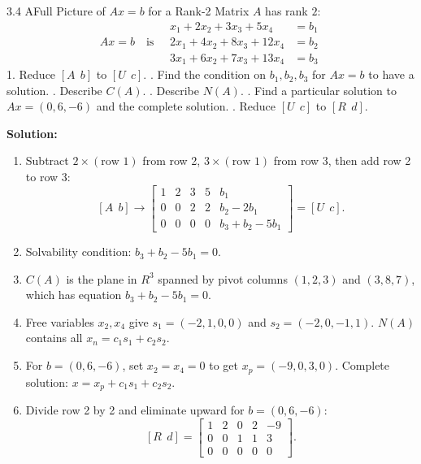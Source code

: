 \documentclass[11pt,a4paper,openany,oneside]{book}
\def\vect#1{#1}%
\def\mathbf#1{#1}%
\newcommand{\vect}[1]{\mathbf{#1}}
\numberwithin{equation}{chapter}
\begin{document}
\begin{example}{3.4 A}{Full Picture of $A\vect{x}=\vect{b}$ for a Rank-2 Matrix}
$A$ has rank $2$:
\[
A\vect{x} = \vect{b} \quad \text{is} \quad \begin{aligned}
x_1 + 2x_2 + 3x_3 + 5x_4 &= b_1 \\
2x_1 + 4x_2 + 8x_3 + 12x_4 &= b_2 \\
3x_1 + 6x_2 + 7x_3 + 13x_4 &= b_3
\end{aligned}
\]
1. Reduce $[A \ \ \vect{b}]$ to $[U \ \ \vect{c}]$. . Find the condition on $b_1, b_2, b_3$ for $A\vect{x}=\vect{b}$ to have a solution. . Describe $C(A)$. . Describe $N(A)$. . Find a particular solution to $A\vect{x} = (0, 6, -6)$ and the complete solution. . Reduce $[U \ \ \vect{c}]$ to $[R \ \ \vect{d}]$.
\end{example}
\textbf{Solution:}
\begin{enumerate}
\item Subtract $2\times(\text{row 1})$ from row 2, $3\times(\text{row 1})$ from row 3, then add row 2 to row 3:
\[
[A \ \ \vect{b}] \to \begin{bmatrix} 1 & 2 & 3 & 5 & b_1 \\ 0 & 0 & 2 & 2 & b_2 - 2b_1 \\ 0 & 0 & 0 & 0 & b_3 + b_2 - 5b_1 \end{bmatrix} = [U \ \ \vect{c}].
\]
\item Solvability condition: $b_3 + b_2 - 5b_1 = 0$.
\item $C(A)$ is the plane in $\mathbf{R}^3$ spanned by pivot columns $(1,2,3)$ and $(3,8,7)$, which has equation $b_3 + b_2 - 5b_1 = 0$.
\item Free variables $x_2, x_4$ give $\vect{s}_1 = (-2,1,0,0)$ and $\vect{s}_2 = (-2,0,-1,1)$. $N(A)$ contains all $\vect{x}_n = c_1\vect{s}_1 + c_2\vect{s}_2$.
\item For $\vect{b} = (0,6,-6)$, set $x_2=x_4=0$ to get $\vect{x}_p = (-9,0,3,0)$. Complete solution: $\vect{x} = \vect{x}_p + c_1\vect{s}_1 + c_2\vect{s}_2$.
\item Divide row 2 by 2 and eliminate upward for $\vect{b}=(0,6,-6)$:
\[
[R \ \ \vect{d}] = \begin{bmatrix} 1 & 2 & 0 & 2 & -9 \\ 0 & 0 & 1 & 1 & 3 \\ 0 & 0 & 0 & 0 & 0 \end{bmatrix}.
\]
\end{enumerate}
\end{document}
